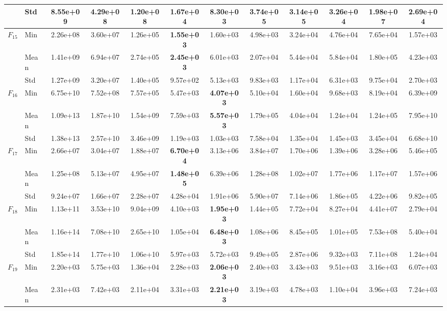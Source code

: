 \begin{center}
\begin{longtable}{clcccccccccc}
 & Std & 8.55e+09 & 4.29e+08 & 1.20e+08 & 1.67e+04 & 8.30e+03 & 3.74e+05 & 3.14e+05 & 3.26e+04 & 1.98e+07 & 2.69e+04 \\
\midrule
\multirow{3}{*}{$F_{15}$} & Min & 2.26e+08 & 3.60e+07 & 1.26e+05 & \textbf{1.55e+03} & 1.60e+03 & 4.98e+03 & 3.24e+04 & 4.76e+04 & 7.65e+04 & 1.57e+03 \\
 & Mean & 1.41e+09 & 6.94e+07 & 2.74e+05 & \textbf{2.45e+03} & 6.01e+03 & 2.07e+04 & 5.44e+04 & 5.84e+04 & 1.80e+05 & 4.23e+03 \\
 & Std & 1.27e+09 & 3.20e+07 & 1.40e+05 & 9.57e+02 & 5.13e+03 & 9.83e+03 & 1.17e+04 & 6.31e+03 & 9.75e+04 & 2.70e+03 \\
\midrule
\multirow{3}{*}{$F_{16}$} & Min & 6.75e+10 & 7.52e+08 & 7.57e+05 & 5.47e+03 & \textbf{4.07e+03} & 5.10e+04 & 1.60e+04 & 9.68e+03 & 8.19e+04 & 6.39e+09 \\
 & Mean & 1.09e+13 & 1.87e+10 & 1.54e+09 & 7.59e+03 & \textbf{5.57e+03} & 1.79e+05 & 4.04e+04 & 1.24e+04 & 1.24e+05 & 7.95e+10 \\
 & Std & 1.38e+13 & 2.57e+10 & 3.46e+09 & 1.19e+03 & 1.03e+03 & 7.58e+04 & 1.35e+04 & 1.45e+03 & 3.45e+04 & 6.68e+10 \\
\midrule
\multirow{3}{*}{$F_{17}$} & Min & 2.66e+07 & 3.04e+07 & 1.88e+07 & \textbf{6.70e+04} & 3.13e+06 & 3.84e+07 & 1.70e+06 & 1.39e+06 & 3.28e+06 & 5.46e+05 \\
 & Mean & 1.25e+08 & 5.13e+07 & 4.95e+07 & \textbf{1.48e+05} & 6.39e+06 & 1.28e+08 & 1.02e+07 & 1.77e+06 & 1.17e+07 & 1.57e+06 \\
 & Std & 9.24e+07 & 1.66e+07 & 2.28e+07 & 4.28e+04 & 1.91e+06 & 5.90e+07 & 7.14e+06 & 1.86e+05 & 4.22e+06 & 9.82e+05 \\
\midrule
\multirow{3}{*}{$F_{18}$} & Min & 1.13e+11 & 3.53e+10 & 9.04e+09 & 4.10e+03 & \textbf{1.95e+03} & 1.44e+05 & 7.72e+04 & 8.27e+04 & 4.41e+07 & 2.79e+04 \\
 & Mean & 1.16e+14 & 7.08e+10 & 2.65e+10 & 1.05e+04 & \textbf{6.48e+03} & 1.08e+06 & 8.45e+05 & 1.01e+05 & 7.53e+08 & 5.40e+04 \\
 & Std & 1.85e+14 & 1.77e+10 & 1.06e+10 & 5.97e+03 & 5.72e+03 & 9.49e+05 & 2.87e+06 & 9.32e+03 & 7.11e+08 & 1.24e+04 \\
\midrule
\multirow{3}{*}{$F_{19}$} & Min & 2.20e+03 & 5.75e+03 & 1.36e+04 & 2.28e+03 & \textbf{2.06e+03} & 2.40e+03 & 3.43e+03 & 9.51e+03 & 3.16e+03 & 6.07e+03 \\
 & Mean & 2.31e+03 & 7.42e+03 & 2.11e+04 & 3.31e+03 & \textbf{2.21e+03} & 3.19e+03 & 4.78e+03 & 1.10e+04 & 3.96e+03 & 7.24e+03 \\

\end{longtable}
\end{center}
